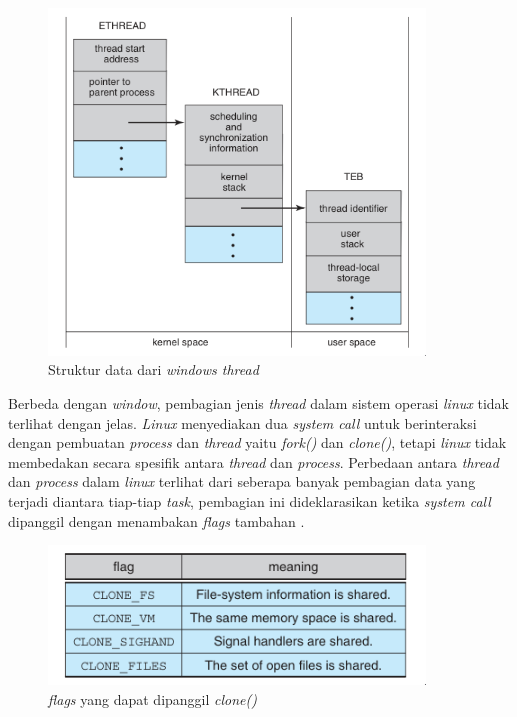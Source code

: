 \begin{figure}[H]
  \centering
	\includegraphics[keepaspectratio, width=10cm]{gambar/windows-thread.png}
  \caption{Struktur data dari \emph{windows thread} \citep{operatingsystemconcept}}
	\label{gambar:windows_thread}
\end{figure}

Berbeda dengan \emph{window}, pembagian jenis \emph{thread} dalam sistem operasi \emph{linux} tidak terlihat dengan jelas. \emph{Linux} menyediakan dua \emph{system call} untuk berinteraksi dengan pembuatan \emph{process} dan \emph{thread} yaitu \emph{fork()} dan \emph{clone()}, tetapi \emph{linux} tidak membedakan secara spesifik antara \emph{thread} dan \emph{process}. Perbedaan antara \emph{thread} dan \emph{process} dalam \emph{linux} terlihat dari seberapa banyak pembagian data yang terjadi diantara tiap-tiap \emph{task}, pembagian ini dideklarasikan ketika \emph{system call} dipanggil dengan menambakan \emph{flags} tambahan \citep{operatingsystemconcept}.

\begin{figure}[H]
  \centering
	\includegraphics[keepaspectratio, width=10cm]{gambar/linux-thread.png}
  \caption{\emph{flags} yang dapat dipanggil \emph{clone()} \citep{operatingsystemconcept}}
	\label{gambar:linux_thread}
\end{figure}

